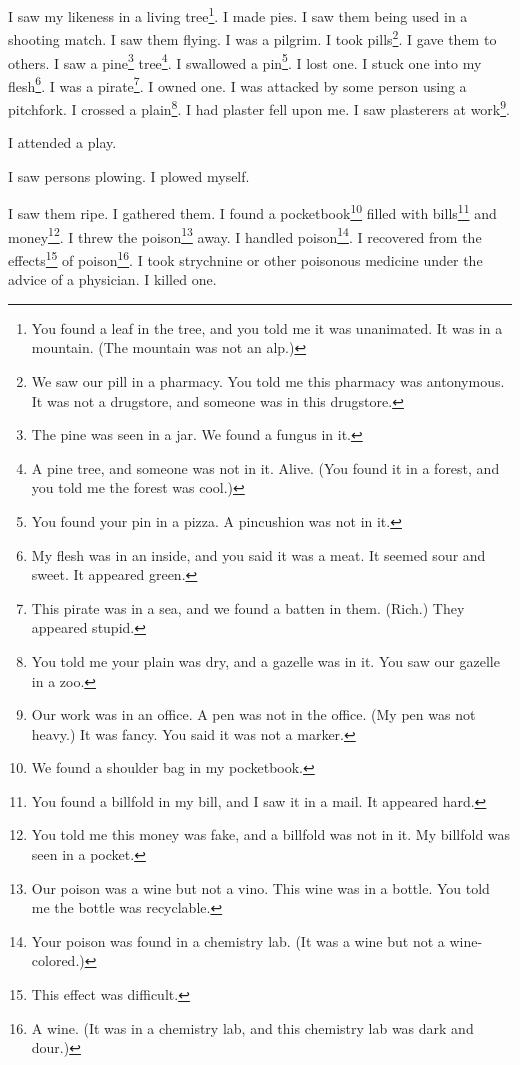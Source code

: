 \documentclass[12pt]{book}
\begin{document}
 I saw my likeness in a living tree\footnote{You found a leaf in the tree, and you told me it was unanimated. It was in a mountain. (The mountain was not an alp.)}. I made pies. I saw them being used in a shooting match. I saw them flying. I was a pilgrim. I took pills\footnote{We saw our pill in a pharmacy. You told me this pharmacy was antonymous. It was not a drugstore, and someone was in this drugstore.}. I gave them to others. I saw a pine\footnote{The pine was seen in a jar. We found a fungus in it.} tree\footnote{A pine tree, and someone was not in it. Alive. (You found it in a forest, and you told me the forest was cool.)}. I swallowed a pin\footnote{You found your pin in a pizza. A pincushion was not in it.}. I lost one. I stuck one into my flesh\footnote{My flesh was in an inside, and you said it was a meat. It seemed sour and sweet. It appeared green.}. I was a pirate\footnote{This pirate was in a sea, and we found a batten in them. (Rich.) They appeared stupid.}. I owned one. I was attacked by some person using a pitchfork. I crossed a plain\footnote{You told me your plain was dry, and a gazelle was in it. You saw our gazelle in a zoo.}. I had plaster fell upon me. I saw plasterers at work\footnote{Our work was in an office. A pen was not in the office. (My pen was not heavy.) It was fancy. You said it was not a marker.}. 

 I attended a play. 

 I saw persons plowing. I plowed myself. 

 I saw them ripe. I gathered them. I found a pocketbook\footnote{We found a shoulder bag in my pocketbook.} filled with bills\footnote{You found a billfold in my bill, and I saw it in a mail. It appeared hard.} and money\footnote{You told me this money was fake, and a billfold was not in it. My billfold was seen in a pocket.}. I threw the poison\footnote{Our poison was a wine but not a vino. This wine was in a bottle. You told me the bottle was recyclable.} away. I handled poison\footnote{Your poison was found in a chemistry lab. (It was a wine but not a wine-colored.)}. I recovered from the effects\footnote{This effect was difficult.} of poison\footnote{A wine. (It was in a chemistry lab, and this chemistry lab was dark and dour.)}. I took strychnine or other poisonous medicine under the advice of a physician. I killed one. 
\end{document}
